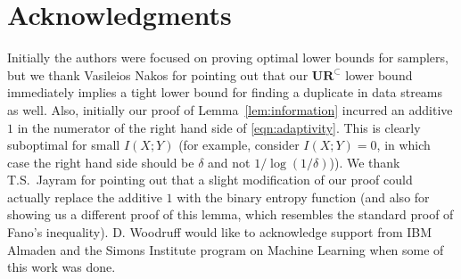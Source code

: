 \documentclass[11pt]{article}
\newcommand{\ur}{\mathbf{UR}\xspace}
\begin{document}
\newpage






\section*{Acknowledgments}
Initially the authors were focused on proving optimal lower bounds for samplers, but we thank Vasileios Nakos for pointing out that our $\ur^\subset$ lower bound immediately implies a tight lower bound for finding a duplicate in data streams as well. Also, initially our proof of Lemma~\ref{lem:information} incurred an additive $1$ in the numerator of the right hand side of \eqref{eqn:adaptivity}. This is clearly suboptimal for small $I(X; Y)$ (for example, consider $I(X; Y) = 0$, in which case the right hand side should be $\delta$ and not $1/\log(1/\delta)$)). We thank T.S.\ Jayram for pointing out that a slight modification of our proof could actually replace the additive $1$ with the binary entropy function (and also for showing us a different proof of this lemma, which resembles the standard proof of Fano's inequality). D. Woodruff would like to acknowledge support from IBM Almaden and the Simons Institute program on Machine Learning when some of this work was done. 




\appendix


\end{document}
